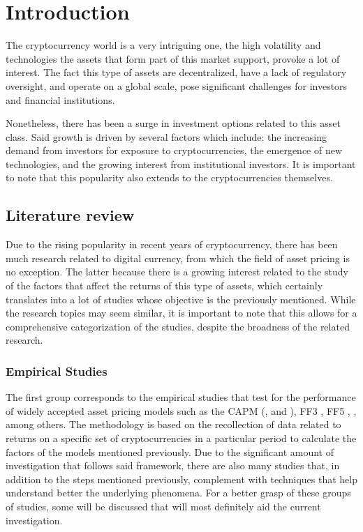 \chapter{Introduction}
\label{c1} %
The cryptocurrency world is a very intriguing one, the high volatility and technologies the assets that form part of this market support, provoke a lot of interest. The fact this type of assets are decentralized, have a lack of regulatory oversight, and operate on a global scale, pose significant challenges for investors and financial institutions. 

Nonetheless, there has been a surge in investment options related to this asset class. Said growth is driven by several factors which include: the increasing demand from investors for exposure to cryptocurrencies, the emergence of new technologies, and the growing interest from institutional investors. It is important to note that this popularity also extends to the cryptocurrencies themselves.

\section{Literature review}
Due to the rising popularity in recent years of cryptocurrency, there has been much research related to digital currency, from which the field of asset pricing is no exception. The latter because there is a growing interest related to the study of the factors that affect the returns of this type of assets, which certainly translates into a lot of studies whose objective is the previously mentioned. While the research topics may seem similar, it is important to note that this allows for a comprehensive categorization of the studies, despite the broadness of the related research.

\subsection{Empirical Studies}
The first group corresponds to the empirical studies that test for the performance of widely accepted asset pricing models such as the CAPM (\cite{sharpe1964}, \cite{Lintner1965} and \cite{mossin1966equilibrium}), FF3 \parencite{fama1993}, FF5 \parencite{fama2015}, \parencite{carhart1997}, among others. The methodology is based on the recollection of data related to returns on a specific set of cryptocurrencies in a particular period to calculate the factors of the models mentioned previously. Due to the significant amount of investigation that follows said framework, there are also many studies that, in addition to the steps mentioned previously, complement with techniques that help understand better the underlying phenomena. For a better grasp of these groups of studies, some will be discussed that will most definitely aid the current investigation.

